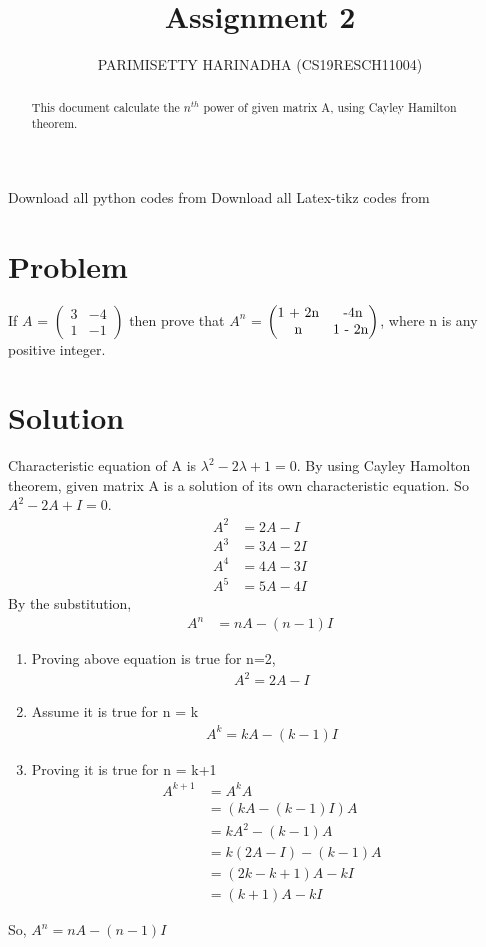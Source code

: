 \documentclass[journal,12pt,twocolumn]{IEEEtran}
\title{Assignment 2}
\author{PARIMISETTY HARINADHA (CS19RESCH11004)}
\newcommand{\myvec}[1]{\ensuremath{\begin{pmatrix}#1\end{pmatrix}}}
\begin{document}
\maketitle
\newpage
\begin{abstract}
This document calculate the $n^{th}$ power of given matrix A, using Cayley Hamilton theorem.
\end{abstract}
Download all python codes from 
Download all Latex-tikz codes from 
\section{Problem}
If $A$ = \myvec{ 3 & -4 \\ 1 & -1 } then prove that $A^n$ = \myvec{ $1 + 2n$ & $ -4n$ \\ $n$ & $1 - 2n$ }, where n is any positive integer.
\section{Solution}
Characteristic equation of A is $\lambda^2 - 2\lambda + 1 = 0$.
By using Cayley Hamolton theorem, given matrix A is a solution of its own characteristic equation. So $A^2 - 2A + I = 0$.
\begin {align}
	A^2 &= 2A - I  \\
	A^3 &= 3A - 2I \\
        A^4 &= 4A - 3I \\
	A^5 &= 5A - 4I
\end{align}
 By the substitution, 
\begin {align}
	A^n &= nA - (n-1)I 
\end{align}
\begin{enumerate}
\item Proving above equation is true for n=2,
\begin {align}
A^2 = 2A -I
\end {align}

\item Assume it is true for n = k
 \begin {align}
A^k = kA -(k-1)I
\end {align}

\item Proving it is true for n = k+1
 \begin {align}
A^{k+1} &= A^k A \\
        &= (kA -(k-1)I)A \\  
        &= kA^2 - (k-1)A \\
        &= k(2A -I) - (k-1)A \\
        &= (2k-k+1)A - kI \\
        &= (k+1)A - kI 
\end {align}
\end{enumerate}
 So, $A^n = nA - (n-1)I$ 
\end{document}
